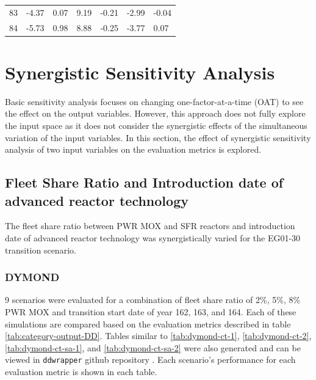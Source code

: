 \begin{table}[H]
\begin{tabularx}{\textwidth}{L|LLLLLL}
            83  & -4.37            & 0.07                           & 9.19          & -0.21                       & -2.99             & -0.04                           \\
            84 & -5.73            & 0.98                           & 8.88          & -0.25                       & -3.77             & 0.07                           \\ \hline
           \end{tabularx}%
        \end{table}

\section{Synergistic Sensitivity Analysis}
\label{sec:synergistic}
Basic sensitivity analysis focuses on changing one-factor-at-a-time 
(OAT) to see the effect on the output variables. 
However, this approach does not fully explore the input space as
it does not consider the synergistic effects of the simultaneous 
variation of the input variables.
In this section, the effect of synergistic sensitivity 
analysis of two input variables on the evaluation metrics is explored. 

\subsection{
Fleet Share Ratio and Introduction date of advanced 
reactor technology}
The fleet share ratio between PWR MOX and SFR 
reactors and introduction date of advanced reactor 
technology was synergistically varied for 
the EG01-30 transition scenario. 

\subsubsection{\textbf{DYMOND}}
9 scenarios were evaluated for a combination of fleet share ratio 
of 2\%, 5\%, 8\% PWR MOX and transition start date of year 162, 163, 
and 164.
Each of these simulations are compared based on the evaluation
metrics described in table \ref{tab:category-output-DD}.
Tables similar to \ref{tab:dymond-ct-1}, \ref{tab:dymond-ct-2}, 
\ref{tab:dymond-ct-sa-1}, and \ref{tab:dymond-ct-sa-2} were also generated
and can be viewed in \texttt{ddwrapper} github repository 
\cite{chee_gwenchee/ddwrapper_2019}. 
Each scenario's performance for each evaluation metric is shown in each table. 

